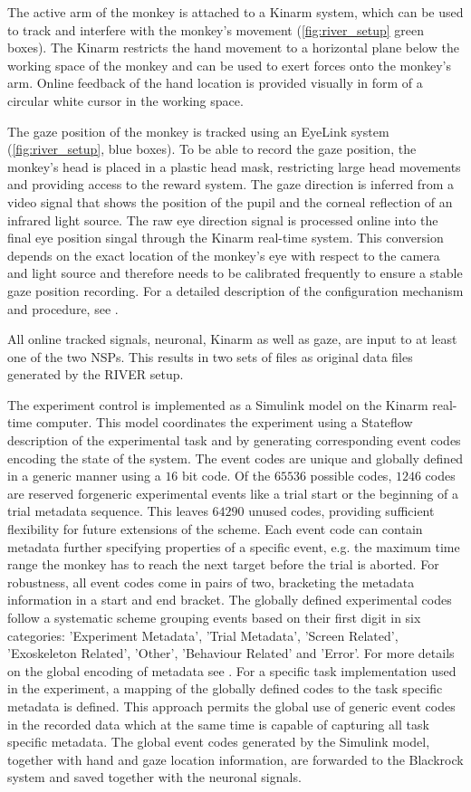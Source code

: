 The active arm of the monkey is attached to a Kinarm system, which can be used to track and interfere with the monkey's movement (\cref{fig:river_setup} green boxes). The Kinarm restricts the hand movement to a horizontal plane below the working space of the monkey and can be used to exert forces onto the monkey's arm. Online feedback of the hand location is provided visually in form of a circular white cursor in the working space.

The gaze position of the monkey is tracked using an EyeLink system (\cref{fig:river_setup}, blue boxes). To be able to record the gaze position, the monkey's head is placed in a plastic head mask, restricting large head movements and providing access to the reward system. The gaze direction is inferred from a video signal that shows the position of the pupil and the corneal reflection of an infrared light source. The raw eye direction signal is processed online into the final eye position singal through the Kinarm real-time system. This conversion depends on the exact location of the monkey's eye with respect to the camera and light source and therefore needs to be calibrated frequently to ensure a stable gaze position recording. For a detailed description of the configuration mechanism and procedure, see \citet{deHaan_2018}.

All online tracked signals, neuronal, Kinarm as well as gaze, are input to at least one of the  two NSPs. This results in two sets of  files as original data files generated by the RIVER setup.

The experiment control is implemented as a Simulink model on the Kinarm real-time computer. This model coordinates the experiment using a Stateflow description of the experimental task and by generating corresponding event codes encoding the state of the system. The event codes are unique and globally defined in a generic manner using a $16$ bit code. Of the $65536$ possible codes, $1246$ codes are reserved forgeneric experimental events like a trial start or the beginning of a trial metadata sequence. This leaves $64290$ unused codes, providing sufficient flexibility for future extensions of the scheme. Each event code can contain metadata further specifying properties of a specific event, e.g. the maximum time range the monkey has to reach the next target before the trial is aborted. For robustness, all event codes come in pairs of two, bracketing the metadata information in a start and end bracket. The globally defined experimental codes follow a systematic scheme grouping events based on their first digit in six categories: 'Experiment Metadata', 'Trial Metadata', 'Screen Related', 'Exoskeleton Related', 'Other', 'Behaviour Related' and 'Error'. For more details on the global encoding of metadata see \citet{deHaan_2018a}.
For a specific task implementation used in the experiment, a mapping of the globally defined codes to the task specific metadata is defined. This approach permits the global use of generic event codes in the recorded data which at the same time is capable of capturing all task specific metadata. The global event codes generated by the Simulink model, together with hand and gaze location information, are forwarded to the Blackrock system and saved together with the neuronal signals.

